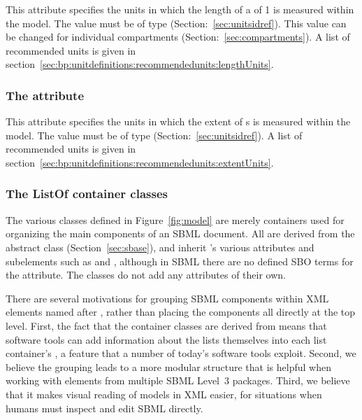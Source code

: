 This attribute specifies the units in which the length of a
\Compartment of  1 is measured within the model. The
value must be of type 
(Section:~\vref{sec:unitsidref}). This value can be changed for
individual compartments (Section:~\vref{sec:compartments}). A
list of recommended units is given in
section~\vref{sec:bp:unitdefinitions:recommendedunits:lengthUnits}.  

\subsubsection{The  attribute}
\label{sec:model-extentUnits}

This attribute specifies the units in which the extent of
{\Reaction}s is measured within the model. The value must be of
type  (Section:~\vref{sec:unitsidref}). A
list of recommended units is given in 
section~\vref{sec:bp:unitdefinitions:recommendedunits:extentUnits}. 


\subsubsection{The ListOf container classes}
\label{sec:listof}
\label{sec:listofunitdefinitions}
\label{sec:listoffunctiondefinitions}
\label{sec:listofcompartments}
\label{sec:listofspecies}
\label{sec:listofparameters}
\label{sec:listofinitialassignments}
\label{sec:listofinitialassign}
\label{sec:listofrules}
\label{sec:listofconstraints}
\label{sec:listofreactions}
\label{sec:listofevents}

The various \ListOf classes defined in Figure~\ref{fig:model}
are merely containers used for organizing the main components of
an SBML document.  All are derived from the abstract class \SBase
(Section~\ref{sec:sbase}), and inherit \SBase's various attributes
and subelements such as  and ,
although in SBML \thisLVR there are no defined SBO terms for the
 attribute.  The \ListOf classes do not add any
attributes of their own.

There are several motivations for grouping SBML components within XML elements named after , rather than
placing the components all directly at the top level.  First, the
fact that the container classes are derived from \SBase means that
software tools can add information about the lists themselves into
each list container's , a feature that a number
of today's software tools exploit.  Second, we believe the
grouping leads to a more modular structure that is helpful when
working with elements from multiple SBML Level~3 packages.  Third,
we believe that it makes visual reading of models in XML easier,
for situations when humans must inspect and edit SBML directly.

